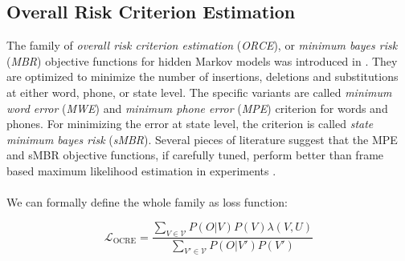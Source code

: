 \subsection{Overall Risk Criterion Estimation}
\label{sec:ocre}
The family of \textit{overall risk criterion estimation} (\textit{ORCE}), or \textit{minimum bayes risk} (\textit{MBR}) objective functions for hidden Markov models was introduced in \cite{kaiser2000novel}. They are optimized to minimize the number of insertions, deletions and substitutions at either word, phone, or state level. The specific variants are called \textit{minimum word error} (\textit{MWE}) and \textit{minimum phone error} (\textit{MPE}) criterion for words and phones. For minimizing the error at state level, the criterion is called \textit{state minimum bayes risk} (\textit{sMBR}). Several pieces of literature suggest that the MPE and sMBR objective functions, if carefully tuned, perform better than frame based maximum likelihood estimation in experiments \cite{povey2002minimum}\cite{gibson2008minimum}\cite{povey2005discriminative}\cite{peddinti2015jhu}. \\ \\
We can formally define the whole family as loss function: 

\[
\mathcal{L}_{\text{OCRE}} = \frac{\sum_{V \in \mathcal{V}} P(O|V)P(V) \lambda(V,U)}{\sum_{V' \in \mathcal{V}} P(O|V')P(V')} 
\]

